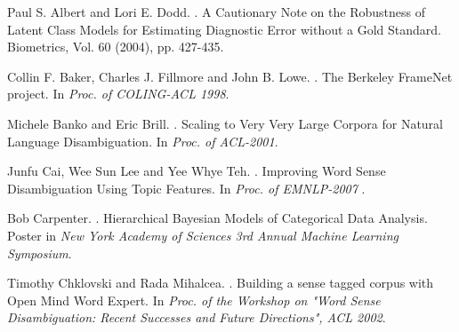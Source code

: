 \documentclass[11pt]{article}
\begin{document}

\begin{thebibliography}{}%


Paul S. Albert and Lori E. Dodd.
.
\newblock A Cautionary Note on the Robustness of Latent Class Models for Estimating Diagnostic Error without a Gold Standard. 
\newblock Biometrics, Vol. 60 (2004), pp. 427-435.


Collin F. Baker, Charles J. Fillmore and John B. Lowe.
.
\newblock The Berkeley FrameNet project. 
\newblock In \textit{Proc. of COLING-ACL 1998}.

Michele Banko and Eric Brill.
.
\newblock Scaling to Very Very Large Corpora for Natural Language Disambiguation.
\newblock In \textit{Proc. of ACL-2001}.

Junfu Cai, Wee Sun Lee and Yee Whye Teh.
.
\newblock Improving Word Sense Disambiguation Using Topic Features.
\newblock In \textit{ Proc. of EMNLP-2007 }.

Bob Carpenter.
.
\newblock Hierarchical Bayesian Models of Categorical Data Analysis. 
\newblock Poster in \textit{ New York Academy of Sciences 3rd Annual Machine Learning Symposium}.

Timothy Chklovski and Rada Mihalcea.
.
\newblock Building a sense tagged corpus with Open Mind Word Expert. 
\newblock In \textit{ Proc. of the Workshop on "Word Sense Disambiguation: Recent Successes and Future Directions", ACL 2002}.


\end{thebibliography}
\end{document}

